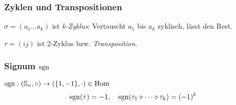 \subsubsection*{Zyklen und Transpositionen}
$\sigma = (a_1 \dots a_k)$ ist \textit{k-Zyklus}:
Vertauscht $a_1$ bis $a_k$ zyklisch, lässt den Rest.

$\tau  = (i j)$ ist 2-Zyklus bzw. \textit{Transposition}.

\subsubsection*{Signum $\operatorname{sgn}$}
$\operatorname{sgn} : (\mathbb{S}_n, \circ) \to (\{1,-1\},\cdot) \in \operatorname{Hom}$
\[\operatorname{sgn}(\tau)=-1, \quad \operatorname{sgn}(\tau_1 \circ \dots \circ \tau_k)=(-1)^k\]
